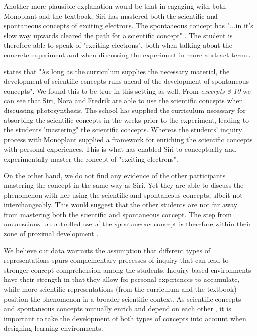 Another more plausible explanation would be that in engaging with both Monoplant and the textbook, Siri has mastered both the scientific and spontaneous concepts of exciting electrons. The spontaneous concept has "...in it's slow way upwards cleared the path for a scientific concept" \citep[p. 194]{vygotsky2012thought}. The student is therefore able to speak of "exciting electrons", both when talking about the concrete experiment and when discussing the experiment in more abstract terms. 

\citet[p. 147]{vygotsky2012thought} states that "As long as the curriculum supplies the necessary material, the development of scientific concepts runs ahead of the development of spontaneous concepts". We found this to be true in this setting as well. From \emph{excerpts 8-10} we can see that Siri, Nora and Fredrik are able to use the scientific concepts when discussing photosynthesis. The school has supplied the curriculum necessary for absorbing the scientific concepts in the weeks prior to the experiment, leading to the students "mastering" the scientific concepts. Whereas the students' inquiry process with Monoplant supplied a framework for enriching the scientific concepts with personal experiences. This is what has enabled Siri to conceptually and experimentally master the concept of "exciting electrons".  

On the other hand, we do not find any evidence of the other participants mastering the concept in the same way as Siri. Yet they are able to discuss the phenomenon with her using the scientific and spontaneous concepts, albeit not interchangeably. This would suggest that the other students are not far away from mastering both the scientific and spontaneous concept. The step from unconscious to controlled use of the spontaneous concept is therefore within their zone of proximal development \citep{vygotsky2012thought}. 

We believe our data warrants the assumption that different types of representations spurs complementary processes of inquiry that can lead to stronger concept comprehension among the students. Inquiry-based environments have their strength in that they allow for personal experiences to accumulate, while more scientific representations (from the curriculum and the textbook) position the phenomenon in a broader scientific context. As scientific concepts and spontaneous concepts mutually enrich and depend on each other \citep{vygotsky2012thought}, it is important to take the development of both types of concepts into account when designing learning environments. 

